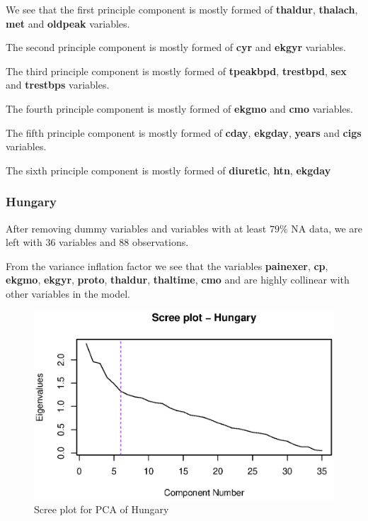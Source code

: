 \documentclass[a4paper]{article}
\begin{document}


We see that the first principle component is mostly formed of \textbf{thaldur}, \textbf{thalach}, \textbf{met} and \textbf{oldpeak} variables.

The second principle component is mostly formed of \textbf{cyr} and \textbf{ekgyr} variables.

The third principle component is mostly formed of \textbf{tpeakbpd}, \textbf{trestbpd}, \textbf{sex} and \textbf{trestbps} variables.

The fourth principle component is mostly formed of \textbf{ekgmo} and \textbf{cmo} variables.

The fifth principle component is mostly formed of \textbf{cday}, \textbf{ekgday}, \textbf{years} and \textbf{cigs} variables.

The sixth principle component is mostly formed of \textbf{diuretic}, \textbf{htn}, \textbf{ekgday}

\subsubsection{Hungary}

After removing dummy variables and variables with at least $79\%$ NA data, we are left with 36 variables and 88 observations. 



From the variance inflation factor we see that the variables \textbf{painexer}, \textbf{cp}, \textbf{ekgmo}, \textbf{ekgyr}, \textbf{proto}, \textbf{thaldur}, \textbf{thaltime}, \textbf{cmo} and  are highly collinear with other variables in the model.

\begin{figure}[H]
	\begin{center}
		\includegraphics[width=12cm]{question3output/hunscreeplot.eps}
	\end{center}
	\caption{Scree plot for PCA of Hungary}
	\label{q3-hun-screeplot}
\end{figure}
\end{document}
